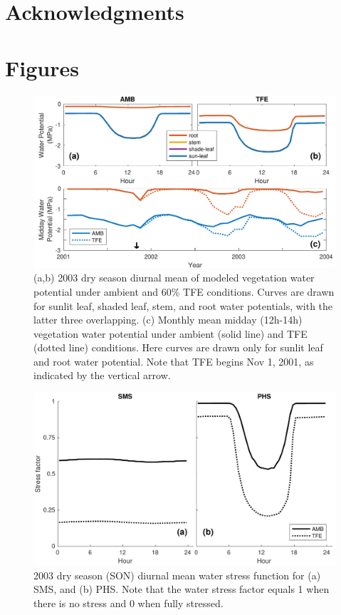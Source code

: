 \documentclass[draft,linenumbers]{agujournal}
\begin{document}
    

\section{Acknowledgments}

\clearpage    

\section{Figures}
  \begin{figure}[h]
     \centering
     \includegraphics[width=30pc]{../figs3/vwp.pdf}
     \caption{(a,b) 2003 dry season diurnal mean of modeled vegetation water potential under ambient and 60\% TFE conditions.
     Curves are drawn for sunlit leaf, shaded leaf, stem, and root water potentials, with the latter three overlapping.
     (c) Monthly mean midday (12h-14h) vegetation water potential under ambient (solid line) and TFE (dotted line) conditions.
     Here curves are drawn only for sunlit leaf and root water potential.
     Note that TFE begins Nov 1, 2001, as indicated by the vertical arrow. 
     }
     \label{fig:vwp}
  \end{figure}

  
    \clearpage
    \begin{figure}[h]
     \centering
     \includegraphics[width=30pc]{../figs3/fig4.pdf}
     \caption{2003 dry season (SON) diurnal mean water stress function for 
     (a) SMS, and
     (b) PHS.
     Note that the water stress factor equals 1 when there is no stress and 0 when fully stressed.
     }
     \label{fig:stress1}
  \end{figure}
  
\end{document}
